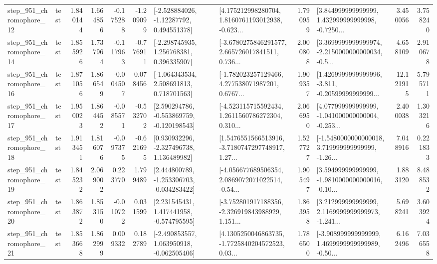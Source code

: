 \begin{tabular}{llrrrrllrlrr}
  step\_951\_chromophore\_12 &      test &      1.840144 &    1.664856 &     -0.175288 & -1.209099 &    [-2.528884026, -1.12287792, 0.494551378] &  [4.175212998280704, 1.8160761193012938, -0.623... &       1.790959 &  [3.844999999999999, 1.432999999999998, -0.7250... &            3.450056 &          3.758240 \\
  step\_951\_chromophore\_14 &      test &      1.855926 &    1.737964 &     -0.117963 & -0.776911 &    [-2.298745935, 1.256768381, 0.396335907] &  [-3.6780275846291577, 2.665726017841511, 0.736... &       2.000808 &  [3.3699999999999974, -2.2150000000000034, -0.5... &            4.658109 &          2.910678 \\
  step\_951\_chromophore\_16 &      test &      1.871056 &    1.866549 &     -0.004507 &  0.078456 &    [-1.064343534, 2.508691813, 0.718701563] &  [-1.782023257129466, 4.277538071987201, 0.6767... &       1.909357 &  [1.4269999999999996, -3.811, -0.20599999999999... &           12.121915 &          5.795711 \\
  step\_951\_chromophore\_17 &      test &      1.950023 &    1.864452 &     -0.085571 & -0.532702 &   [2.590294786, -0.553869759, -0.120198543] &  [-4.523115715592434, 1.2611560786272304, 0.310... &       2.066950 &  [4.077999999999999, -1.041000000000004, -0.253... &            2.400038 &          1.303216 \\
  step\_951\_chromophore\_18 &      test &      1.913451 &    1.816076 &     -0.097375 & -0.621695 &    [0.930932296, -2.327496738, 1.136489982] &  [1.5476551566513916, -3.7180747297748917, 1.27... &       1.527727 &  [-1.5480000000000018, 3.719999999999999, -1.26... &            7.048916 &          0.221833 \\
  step\_951\_chromophore\_19 &      test &      1.845232 &    2.069002 &      0.223770 &  1.799489 &   [2.444800789, -1.253306703, -0.034283422] &  [-4.056677689506354, 2.0869072071022514, -0.54... &       1.905497 &  [3.594999999999999, -1.9810000000000016, -0.10... &            1.883120 &          8.488532 \\
  step\_951\_chromophore\_20 &      test &      1.863872 &    1.853150 &     -0.010722 &  0.031599 &    [2.231545431, 1.417441958, -0.574795595] &  [-3.752801917188356, -2.326919843988929, 1.151... &       1.863958 &  [3.212999999999999, 2.1169999999999973, -1.241... &            5.698241 &          3.603924 \\
  step\_951\_chromophore\_21 &      test &      1.853668 &    1.862999 &      0.009332 &  0.182789 &   [-2.490853557, 1.063950918, -0.062505406] &  [4.1305250046863735, -1.7725840204572523, 0.03... &       1.786500 &  [-3.908999999999999, 1.4699999999999989, -0.50... &            6.162496 &          7.036558 \\

\end{tabular}
